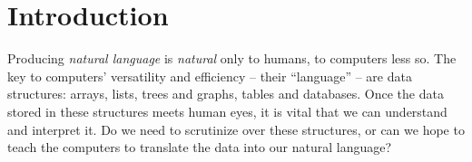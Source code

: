 \documentclass[12pt,notitlepage,a4paper,openright]{report}
\begin{document}
\cleardoublepage{}
\tableofcontents %

\cleardoublepage{}
\renewcommand{\chapterheadstartvskip}{\vspace*{-10mm}} %

%
%
\renewcommand{\thepage}{\arabic{page}}
\setcounter{page}{1}




\sloppy
% 
% 
% 

\chapter{Introduction}
\label{chap:intro}
Producing \textit{natural language} is \textit{natural} only to humans, to computers less so. The key to computers' versatility and efficiency -- their ``language'' -- are data structures: arrays, lists, trees and graphs, tables and databases. Once the data stored in these structures meets human eyes, it is vital that we can understand and interpret it. Do we need to scrutinize over these structures, or can we hope to teach the computers to translate the data into our natural language?
\end{document}
